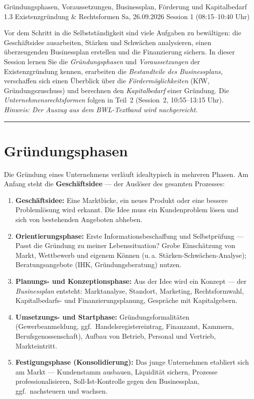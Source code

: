 \documentclass[11pt, a4paper]{article}
\begin{document}
%
  {Gründungsphasen, Voraussetzungen, Businessplan, Förderung und Kapitalbedarf}%
  {1.3 Existenzgründung \& Rechtsformen}%
  {Sa, 26.09.2026 \textperiodcentered{} Session 1 (08:15--10:40 Uhr)}

\begin{merksatz}[title={\bfseries Worum geht es in Teil 1?}]
Vor dem Schritt in die Selbstständigkeit sind viele Aufgaben zu bewältigen: die
Geschäftsidee ausarbeiten, Stärken und Schwächen analysieren, einen überzeugenden
Businessplan erstellen und die Finanzierung sichern. In dieser Session lernen Sie die
\emph{Gründungsphasen} und \emph{Voraussetzungen} der Existenzgründung kennen, erarbeiten
die \emph{Bestandteile des Businessplans}, verschaffen sich einen Überblick über die
\emph{Fördermöglichkeiten} (KfW, Gründungszuschuss) und berechnen den
\emph{Kapitalbedarf} einer Gründung. Die \emph{Unternehmensrechtsformen} folgen in
Teil~2 (Session~2, 10:55--13:15 Uhr). \emph{Hinweis: Der Auszug aus dem BWL-Textband
wird nachgereicht.}
\end{merksatz}

\tableofcontents
\vspace{1em}
\hrule
\vspace{1em}

\section{Gründungsphasen}

Die Gründung eines Unternehmens verläuft idealtypisch in mehreren Phasen. Am Anfang steht
die \textbf{Geschäftsidee} --- der Auslöser des gesamten Prozesses:

\begin{enumerate}
  \item \textbf{Geschäftsidee:} Eine Marktlücke, ein neues Produkt oder eine bessere
    Problemlösung wird erkannt. Die Idee muss ein Kundenproblem lösen und sich von
    bestehenden Angeboten abheben.
  \item \textbf{Orientierungsphase:} Erste Informationsbeschaffung und Selbstprüfung ---
    Passt die Gründung zu meiner Lebenssituation? Grobe Einschätzung von Markt, Wettbewerb
    und eigenem Können (u.\,a. Stärken-Schwächen-Analyse); Beratungsangebote (IHK,
    Gründungsberatung) nutzen.
  \item \textbf{Planungs- und Konzeptionsphase:} Aus der Idee wird ein Konzept --- der
    \emph{Businessplan} entsteht: Marktanalyse, Standort, Marketing, Rechtsformwahl,
    Kapitalbedarfs- und Finanzierungsplanung, Gespräche mit Kapitalgebern.
  \item \textbf{Umsetzungs- und Startphase:} Gründungsformalitäten (Gewerbeanmeldung,
    ggf.\ Handelsregistereintrag, Finanzamt, Kammern, Berufsgenossenschaft), Aufbau von
    Betrieb, Personal und Vertrieb, Markteintritt.
  \item \textbf{Festigungsphase (Konsolidierung):} Das junge Unternehmen etabliert sich am
    Markt --- Kundenstamm ausbauen, Liquidität sichern, Prozesse professionalisieren,
    Soll-Ist-Kontrolle gegen den Businessplan, ggf.\ nachsteuern und wachsen.
\end{enumerate}
\end{document}
